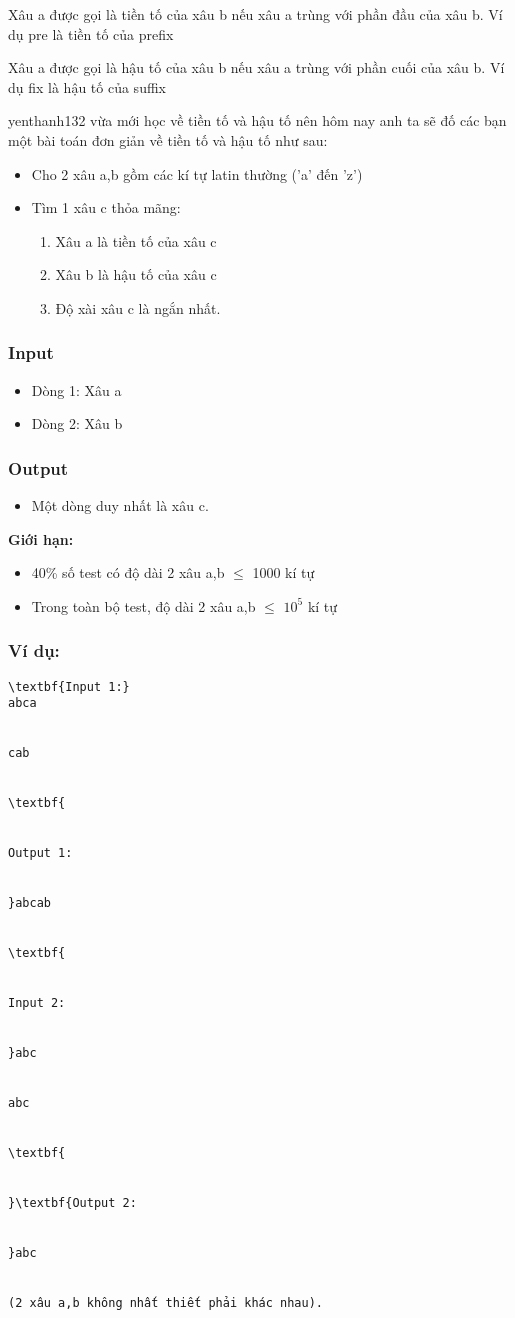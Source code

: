 



   Xâu a được gọi là   tiền tố   của xâu b nếu xâu a trùng với phần đầu của xâu b. Ví dụ       pre      là tiền tố của       prefix   

   Xâu a được gọi là   hậu tố   của xâu b nếu xâu a trùng với phần cuối của xâu b. Ví dụ       fix      là hậu tố của       suffix   

yenthanh132   vừa mới học về tiền tố và hậu tố nên hôm nay anh ta sẽ đố các bạn một bài toán đơn giản về tiền tố và hậu tố như sau:  
\begin{itemize}
	\item     Cho 2 xâu a,b gồm các kí tự latin thường ('a' đến 'z')   
	\item     Tìm 1 xâu c thỏa mãng:    
\begin{enumerate}
	\item       Xâu a là tiền tố của xâu c     
	\item       Xâu b là hậu tố của xâu c     
	\item       Độ xài xâu c là ngắn nhất.     
\end{enumerate}
\end{itemize}
\begin{enumerate}
\end{enumerate}

\subsubsection{   Input  }
\begin{itemize}
	\item     Dòng 1: Xâu a   
	\item     Dòng 2: Xâu b   
\end{itemize}

\subsubsection{   Output  }
\begin{itemize}
	\item     Một dòng duy nhất là xâu c.   
\end{itemize}

\textbf{     Giới hạn:    }
\begin{itemize}
	\item     40\% số test có độ dài 2 xâu a,b  $\le$  1000 kí tự   
	\item     Trong toàn bộ test, độ dài 2 xâu a,b  $\le$  $10^{5}$    kí tự   
\end{itemize}

\subsubsection{\textbf{    Ví dụ:   }}
\begin{verbatim}
\textbf{Input 1:}
abca


cab


\textbf{


Output 1:


}abcab


\textbf{


Input 2:


}abc


abc


\textbf{


}\textbf{Output 2:


}abc


(2 xâu a,b không nhất thiết phải khác nhau).\end{verbatim}
